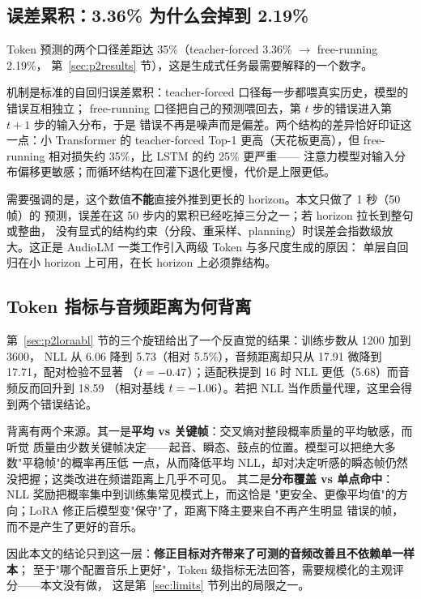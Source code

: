 \documentclass[UTF8,10pt,a4paper]{ctexart}
\begin{document}
\subsection{误差累积：3.36\% 为什么会掉到 2.19\%}\label{sec:errcum}

Token 预测的两个口径差距达 35\%（teacher-forced 3.36\% $\to$ free-running 2.19\%，
第~\ref{sec:p2results} 节），这是生成式任务最需要解释的一个数字。

机制是标准的自回归误差累积：teacher-forced 口径每一步都喂真实历史，模型的错误互相独立；
free-running 口径把自己的预测喂回去，第 $t$ 步的错误进入第 $t+1$ 步的输入分布，于是
错误不再是噪声而是偏差。两个结构的差异恰好印证这一点：小 Transformer 的 teacher-forced
Top-1 更高（天花板更高），但 free-running 相对损失约 35\%，比 LSTM 的约 25\% 更严重——
注意力模型对输入分布偏移更敏感；而循环结构在回灌下退化更慢，代价是上限更低。

需要强调的是，这个数值\textbf{不能}直接外推到更长的 horizon。本文只做了 1 秒（50 帧）的
预测，误差在这 50 步内的累积已经吃掉三分之一；若 horizon 拉长到整句或整曲，
没有显式的结构约束（分段、重采样、planning）时误差会指数级放大。这正是
AudioLM 一类工作引入两级 Token 与多尺度生成的原因\cite{borsos2023audiolm}：
单层自回归在小 horizon 上可用，在长 horizon 上必须靠结构。

\subsection{Token 指标与音频距离为何背离}\label{sec:disagree}

第~\ref{sec:p2loraabl} 节的三个旋钮给出了一个反直觉的结果：训练步数从 1200 加到 3600，
NLL 从 6.06 降到 5.73（相对 5.5\%），音频距离却只从 17.91 微降到 17.71，配对检验不显著
（$t=-0.47$）；适配秩提到 16 时 NLL 更低（5.68）而音频反而回升到 18.59
（相对基线 $t=-1.06$）。若把 NLL 当作质量代理，这里会得到两个错误结论。

背离有两个来源。其一是\textbf{平均 vs 关键帧}：交叉熵对整段概率质量的平均敏感，而听觉
质量由少数关键帧决定——起音、瞬态、鼓点的位置。模型可以把绝大多数"平稳帧"的概率再压低
一点，从而降低平均 NLL，却对决定听感的瞬态帧仍然没把握；这类改进在频谱距离上几乎不可见。
其二是\textbf{分布覆盖 vs 单点命中}：NLL 奖励把概率集中到训练集常见模式上，而这恰是
"更安全、更像平均值"的方向；LoRA 修正后模型变"保守"了，距离下降主要来自不再产生明显
错误的帧，而不是产生了更好的音乐。

因此本文的结论只到这一层：\textbf{修正目标对齐带来了可测的音频改善且不依赖单一样本}；
至于"哪个配置音乐上更好"，Token 级指标无法回答，需要规模化的主观评分——本文没有做，
这是第~\ref{sec:limits} 节列出的局限之一。
\end{document}
